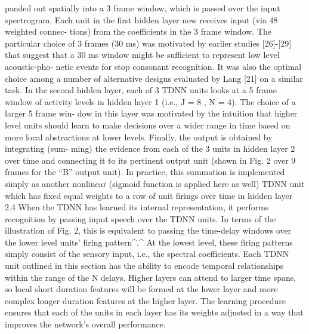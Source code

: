 panded out spatially into a 3 frame window, which is
passed over the input spectrogram. Each unit in the first
hidden layer now receives input (via 48 weighted connec-
tions) from the coefficients in the 3 frame window. The
particular choice of 3 frames (30 ms) was motivated by
earlier studies [26]-[29] that suggest that a 30 ms window
might be sufficient to represent low level acoustic-pho-
netic events for stop consonant recognition. It was also
the optimal choice among a number of alternative designs
evaluated by Lang [21] on a similar task.
In the second hidden layer, each of 3 TDNN units looks
at a 5 frame window of activity levels in hidden layer 1
(i.e., J = 8 , N = 4). The choice of a larger 5 frame win-
dow in this layer was motivated by the intuition that higher
level units should learn to make decisions over a wider
range in time based on more local abstractions at lower
levels.
Finally, the output is obtained by integrating (sum-
ming) the evidence from each of the 3 units in hidden
layer 2 over time and connecting it to its pertinent output
unit (shown in Fig. 2 over 9 frames for the “B” output
unit). In practice, this summation is implemented simply
as another nonlinear (sigmoid function is applied here as
well) TDNN unit which has fixed equal weights to a row
of unit firings over time in hidden layer 2.4
When the TDNN has learned its internal representation,
it performs recognition by passing input speech over the
TDNN units. In terms of the illustration of Fig. 2, this is
equivalent to passing the time-delay windows over the
lower level units' firing pattern^.^ At the lowest level,
these firing patterns simply consist of the sensory input,
i.e., the spectral coefficients.
Each TDNN unit outlined in this section has the ability
to encode temporal relationships within the range of the
N delays. Higher layers can attend to larger time spans,
so local short duration features will be formed at the lower
layer and more complex longer duration features at the
higher layer. The learning procedure ensures that each of
the units in each layer has its weights adjusted in a way
that improves the network's overall performance.




